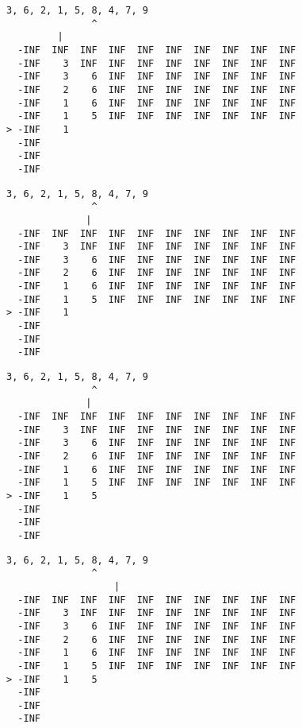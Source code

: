 { \begin{verbatim}
3, 6, 2, 1, 5, 8, 4, 7, 9
               ^
         |
  -INF  INF  INF  INF  INF  INF  INF  INF  INF  INF
  -INF    3  INF  INF  INF  INF  INF  INF  INF  INF
  -INF    3    6  INF  INF  INF  INF  INF  INF  INF
  -INF    2    6  INF  INF  INF  INF  INF  INF  INF
  -INF    1    6  INF  INF  INF  INF  INF  INF  INF
  -INF    1    5  INF  INF  INF  INF  INF  INF  INF
> -INF    1                                        
  -INF                                             
  -INF                                             
  -INF                                             
\end{verbatim} }

{ \begin{verbatim}
3, 6, 2, 1, 5, 8, 4, 7, 9
               ^
              |
  -INF  INF  INF  INF  INF  INF  INF  INF  INF  INF
  -INF    3  INF  INF  INF  INF  INF  INF  INF  INF
  -INF    3    6  INF  INF  INF  INF  INF  INF  INF
  -INF    2    6  INF  INF  INF  INF  INF  INF  INF
  -INF    1    6  INF  INF  INF  INF  INF  INF  INF
  -INF    1    5  INF  INF  INF  INF  INF  INF  INF
> -INF    1                                        
  -INF                                             
  -INF                                             
  -INF                                             
\end{verbatim} }

{ \begin{verbatim}
3, 6, 2, 1, 5, 8, 4, 7, 9
               ^
              |
  -INF  INF  INF  INF  INF  INF  INF  INF  INF  INF
  -INF    3  INF  INF  INF  INF  INF  INF  INF  INF
  -INF    3    6  INF  INF  INF  INF  INF  INF  INF
  -INF    2    6  INF  INF  INF  INF  INF  INF  INF
  -INF    1    6  INF  INF  INF  INF  INF  INF  INF
  -INF    1    5  INF  INF  INF  INF  INF  INF  INF
> -INF    1    5                                   
  -INF                                             
  -INF                                             
  -INF                                             
\end{verbatim} }

{ \begin{verbatim}
3, 6, 2, 1, 5, 8, 4, 7, 9
               ^
                   |
  -INF  INF  INF  INF  INF  INF  INF  INF  INF  INF
  -INF    3  INF  INF  INF  INF  INF  INF  INF  INF
  -INF    3    6  INF  INF  INF  INF  INF  INF  INF
  -INF    2    6  INF  INF  INF  INF  INF  INF  INF
  -INF    1    6  INF  INF  INF  INF  INF  INF  INF
  -INF    1    5  INF  INF  INF  INF  INF  INF  INF
> -INF    1    5                                   
  -INF                                             
  -INF                                             
  -INF                                             
\end{verbatim} }

